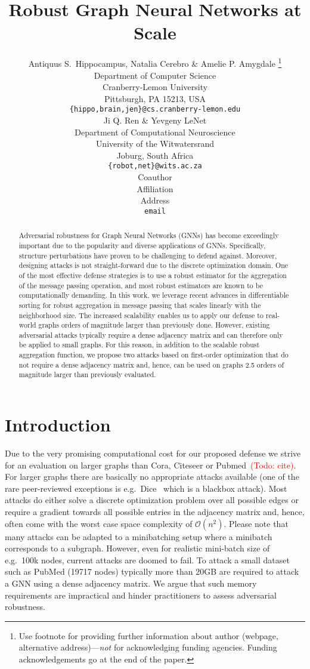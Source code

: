 \documentclass{article} %
\title{Robust Graph Neural Networks at Scale}
\author{Antiquus S.~Hippocampus, Natalia Cerebro \& Amelie P. Amygdale \thanks{ Use footnote for providing further information
about author (webpage, alternative address)---\emph{not} for acknowledging
funding agencies.  Funding acknowledgements go at the end of the paper.} \\
Department of Computer Science\\
Cranberry-Lemon University\\
Pittsburgh, PA 15213, USA \\
\texttt{\{hippo,brain,jen\}@cs.cranberry-lemon.edu} \\
\And
Ji Q. Ren \& Yevgeny LeNet \\
Department of Computational Neuroscience \\
University of the Witwatersrand \\
Joburg, South Africa \\
\texttt{\{robot,net\}@wits.ac.za} \\
\AND
Coauthor \\
Affiliation \\
Address \\
\texttt{email}
}
\newcommand{\todo}[1]{\textcolor{red}{(Todo: #1)}}
\begin{document}
\maketitle

\begin{abstract}

Adversarial robustness for Graph Neural Networks (GNNs) has become exceedingly important due to the popularity and diverse applications of GNNs. Specifically, structure perturbations have proven to be challenging to defend against. Moreover, designing attacks is not straight-forward due to the discrete optimization domain. One of the most effective defense strategies is to use a robust estimator for the aggregation of the message passing operation, and most robust estimators are known to be computationally demanding. In this work, we leverage recent advances in differentiable sorting for robust aggregation in message passing that scales linearly with the neighborhood size. The increased scalability enables us to apply our defense to real-world graphs orders of magnitude larger than previously done. However, existing adversarial attacks typically require a dense adjacency matrix and can therefore only be applied to small graphs. For this reason, in addition to the scalable robust aggregation function, we propose two attacks based on first-order optimization that do not require a dense adjacency matrix and, hence, can be used on graphs 2.5 orders of magnitude larger than previously evaluated.

\end{abstract}


\section{Introduction} %

Due to the very promising computational cost for our proposed defense we strive for an evaluation on larger graphs than Cora, Citeseer or Pubmed~\todo{cite}. For larger graphs there are basically no appropriate attacks available (one of the rare peer-reviewed exceptions is e.g.~Dice~\citep{Waniek2018} which is a blackbox attack). Most attacks do either solve a discrete optimization problem over all possible edges or require a gradient towards all possible entries in the adjacency matrix and, hence, often come with the worst case space complexity of \(\mathcal{O}(n^2)\). Please note that many attacks can be adapted to a minibatching setup where a minibatch corresponds to a subgraph. However, even for realistic mini-batch size of e.g.~100k nodes, current attacks are doomed to fail. To attack a small dataset such as PubMed (19717 nodes) typically more than 20GB are required to attack a GNN using a dense adjacency matrix. We argue that such memory requirements are impractical and hinder practitioners to assess adversarial robustness.
\end{document}

